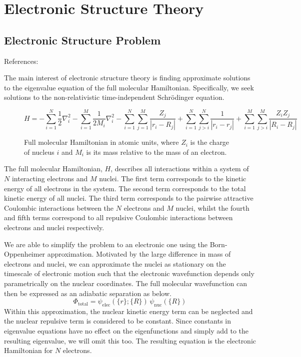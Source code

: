 \section{\label{electronic-structure-theory}Electronic Structure Theory}

\subsection{Electronic Structure Problem}
References: \cite{Atilla1996}

The main interest of electronic structure theory is finding approximate solutions to the eigenvalue equation of the full molecular Hamiltonian. Specifically, we seek solutions to the non-relativistic time-independent Schrödinger equation.
\begin{figure}[H]
\centering
\begin{equation*}
    H =
    - \sum_{i=1}^{N} \frac{1}{2} \nabla^{2}_{i}
    - \sum_{i=1}^{M} \frac{1}{2M_i} \nabla^{2}_{i}
    - \sum_{i=1}^{N} \sum_{j=1}^{M} \frac{Z_j}{|r_{i} - R_{j}|}
    + \sum_{i=1}^{N} \sum_{j>i}^{N} \frac{1}{|r_{i} - r_{j}|}
    + \sum_{i=1}^{M} \sum_{j>i}^{M} \frac{Z_{i} Z_{j}}{|R_{i} - R_{j}|}
\end{equation*}
\caption{Full molecular Hamiltonian in atomic units, where $Z_i$ is the charge of nucleus $i$ and $M_i$ is its mass relative to the mass of an electron.}
\end{figure}
The full molecular Hamiltonian, $H$, describes all interactions within a system of $N$ interacting electrons and $M$ nuclei. The first term corresponds to the kinetic energy of all electrons in the system. The second term corresponds to the total kinetic energy of all nuclei. The third term corresponds to the pairwise attractive Coulombic interactions between the $N$ electrons and $M$ nuclei, whilst the fourth and fifth terms correspond to all repulsive Coulombic interactions between electrons and nuclei respectively.

We are able to simplify the problem to an electronic one using the Born-Oppenheimer approximation. Motivated by the large difference in mass of electrons and nuclei, we can approximate the nuclei as stationary on the timescale of electronic motion such that the electronic wavefunction depends only parametrically on the nuclear coordinates. The full molecular wavefunction can then be expressed as an adiabatic separation as below.
\begin{equation*}
    \Phi_\text{total} =
    \psi_\text{elec}({\{r\}};\{R\}) \,
    \psi_\text{nuc}(\{R\})
\end{equation*}
Within this approximation, the nuclear kinetic energy term can be neglected and the nuclear repulsive term is considered to be constant. Since constants in eigenvalue equations have no effect on the eigenfunctions and simply add to the resulting eigenvalue, we will omit this too. The resulting equation is the electronic Hamiltonian for $N$ electrons. 

